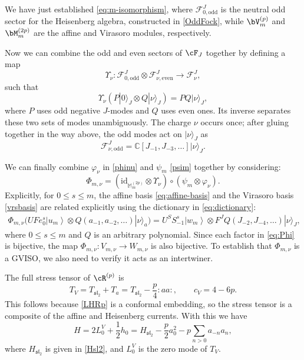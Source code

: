 \documentclass[a4paper,11pt]{article}
\theoremstyle{definition}
\theoremstyle{definition}
\theoremstyle{remark}
\newcommand{\ket}[1]{\ensuremath{\left|#1\right\rangle}}
\newcommand{\be}{\begin{equation}}
\newcommand{\ee}{\end{equation}}
\newcommand{\beqn}{\begin{eqnarray}}
\newcommand{\eeqn}{\end{eqnarray}}
\newcommand{\C}{\mathbb C}
\newcommand{\id}{\mathrm{id}}
\begin{document}

We have just established  \eqref{eq:m-isomorphism},
where  $\mathcal F^J_{0,\mathrm{odd}}$ is the neutral odd sector  for the Heisenberg  algebra, constructed in \eqref{OddFock}, while $\bV_m^{(p)}$ and $\bM_m^{(2p)}$ are the     affine  and  Virasoro modules, respectively.

Now we can combine the odd and even sectors of $\cF_J$ together by defining a map 
\be
\Upsilon_\nu:
\mathcal F^J_{0,\mathrm{odd}}\otimes
\mathcal F^J_{\nu,\mathrm{even}}
\longrightarrow\mathcal F_\nu^J,
\ee
such that
\be
\Upsilon_\nu(P|0\rangle_J\otimes Q|\nu\rangle_J)
=PQ|\nu\rangle_J,
\label{eq:mu}
\ee
where $P$ uses odd negative $J$-modes and $Q$ uses even ones.
Its inverse separates these two sets of modes unambiguously. The charge
$\nu$ occurs once; after gluing together in the way above, the odd modes act on $|\nu\rangle_J$ as
\be
\mathcal F^J_{\nu,\mathrm{odd}}
=\C[J_{-1},J_{-3},\ldots]|\nu\rangle_J.
\ee

We can finally combine $\varphi_\nu$ in   \eqref{phinu} and     $\psi_m$  \eqref{psim}  together by considering: 
\be
\Phi_{m,\nu}
=(\id_{\mathbb M_m^{(2p)}}\otimes\Upsilon_\nu)
\circ(\psi_m\otimes\varphi_\nu).
\label{eq:Phi}
\ee
Explicitly, for $0\leq s\leq m$,   the   affine basis   \eqref{eq:affine-basis}
and the Virasoro basis \eqref{vrsbasis} are related explicitly using the dictionary in   \eqref{eq:dictionary}:
\beqn
  \Phi_{m,\nu}
\Big(UF e_0^s \ket{u_m}\otimes Q(a_{-1},a_{-2},\ldots)|\nu\rangle_a\Big)
 =U^SS_{-1}^s\ket{w_m}\otimes
F^JQ(J_{-2},J_{-4},\ldots)|\nu\rangle_J,\;\qquad\quad%
\label{eq:Phi-explicit}
\eeqn  
where $0\leq s\leq m$ and  $Q$ is an arbitrary  polynomial. 
Since each factor in \eqref{eq:Phi} is bijective, the map 
$\Phi_{m,\nu}:V_{m,\nu}\to W_{m,\nu}$ is also bijective.
To establish that  $\Phi_{m,\nu}$ is a GVISO, we also need to verify it acts as  an intertwiner. 


The full   stress tensor of $\cR ^{(p)}$  is
\be
T_V=T_{\mathfrak{sl}_2}+T_a=T_{\mathfrak{sl}_2}-\frac p4:aa:, 
\qquad c_V=4-6p.
\ee
This follows because \eqref{LHRp} is a conformal embedding, so the stress tensor is a composite
of the affine and Heisenberg currents.
With this we have
\be
H=2L_0^V+\frac12h_0
=H_{\mathfrak{sl}_2}-\frac p2a_0^2
-p\sum_{n>0}a_{-n}a_n,
\label{eq:full-source-grading}
\ee
where $H_{\mathfrak{sl}_2}$  is given in \eqref{Hsl2}, and $L_0^V$ is the zero mode of $T_V$.
\end{document}

